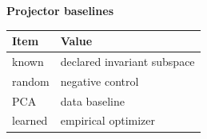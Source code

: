 \begin{center}
\textbf{Projector baselines}\par\smallskip
\begin{tabular}{ll}
\toprule
Item & Value \\
\midrule
known & declared invariant subspace \\
random & negative control \\
PCA & data baseline \\
learned & empirical optimizer \\
\bottomrule
\end{tabular}
\end{center}

